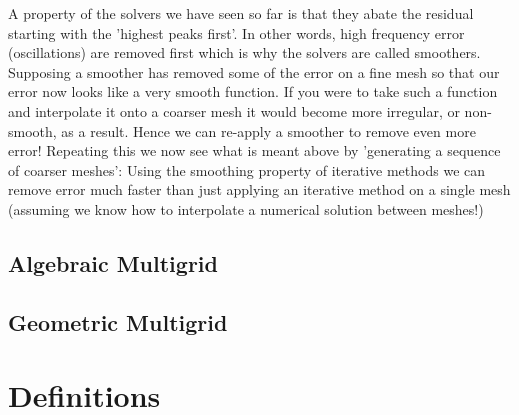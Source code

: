 A property of the solvers we have seen so far is that they abate the residual starting
with the 'highest peaks first'. In other words, high frequency error (oscillations) are
removed first which is why the solvers are called smoothers. Supposing a smoother has removed
some of the error on a fine mesh so that our error now looks like a very smooth function.
If you were to take such a function and interpolate it onto a coarser mesh it would
become more irregular, or non-smooth, as a result. Hence we can re-apply a smoother to
remove even more error! Repeating this we now see what is meant above by 'generating a
sequence of coarser meshes': Using the smoothing property of iterative methods we can
remove error much faster than just applying an iterative method on a single mesh (assuming
we know how to interpolate a numerical solution between meshes!)

\subsection{Algebraic Multigrid}
\subsection{Geometric Multigrid}

\section{Definitions}

